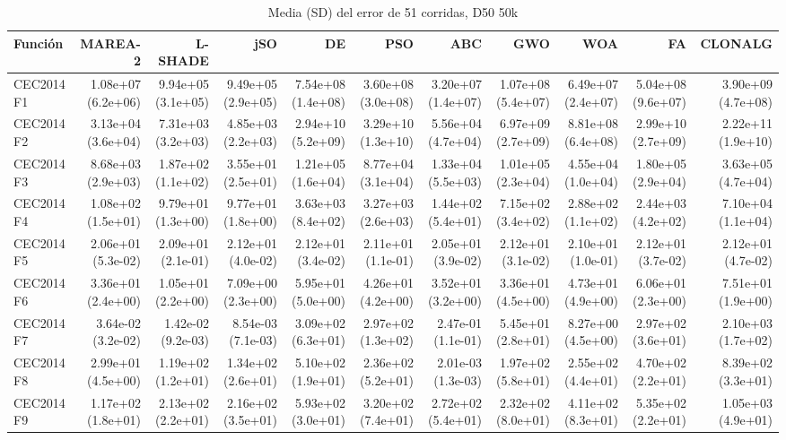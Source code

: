 \begin{longtable}{lrrrrrrrrrr}
\caption{Media (SD) del error de 51 corridas, D50 50k}\\
\toprule
Función & MAREA-2 & L-SHADE & jSO & DE & PSO & ABC & GWO & WOA & FA & CLONALG \\
\midrule
\endhead
CEC2014 F1 & 1.08e+07 (6.2e+06) & 9.94e+05 (3.1e+05) & 9.49e+05 (2.9e+05) & 7.54e+08 (1.4e+08) & 3.60e+08 (3.0e+08) & 3.20e+07 (1.4e+07) & 1.07e+08 (5.4e+07) & 6.49e+07 (2.4e+07) & 5.04e+08 (9.6e+07) & 3.90e+09 (4.7e+08) \\
CEC2014 F2 & 3.13e+04 (3.6e+04) & 7.31e+03 (3.2e+03) & 4.85e+03 (2.2e+03) & 2.94e+10 (5.2e+09) & 3.29e+10 (1.3e+10) & 5.56e+04 (4.7e+04) & 6.97e+09 (2.7e+09) & 8.81e+08 (6.4e+08) & 2.99e+10 (2.7e+09) & 2.22e+11 (1.9e+10) \\
CEC2014 F3 & 8.68e+03 (2.9e+03) & 1.87e+02 (1.1e+02) & 3.55e+01 (2.5e+01) & 1.21e+05 (1.6e+04) & 8.77e+04 (3.1e+04) & 1.33e+04 (5.5e+03) & 1.01e+05 (2.3e+04) & 4.55e+04 (1.0e+04) & 1.80e+05 (2.9e+04) & 3.63e+05 (4.7e+04) \\
CEC2014 F4 & 1.08e+02 (1.5e+01) & 9.79e+01 (1.3e+00) & 9.77e+01 (1.8e+00) & 3.63e+03 (8.4e+02) & 3.27e+03 (2.6e+03) & 1.44e+02 (5.4e+01) & 7.15e+02 (3.4e+02) & 2.88e+02 (1.1e+02) & 2.44e+03 (4.2e+02) & 7.10e+04 (1.1e+04) \\
CEC2014 F5 & 2.06e+01 (5.3e-02) & 2.09e+01 (2.1e-01) & 2.12e+01 (4.0e-02) & 2.12e+01 (3.4e-02) & 2.11e+01 (1.1e-01) & 2.05e+01 (3.9e-02) & 2.12e+01 (3.1e-02) & 2.10e+01 (1.0e-01) & 2.12e+01 (3.7e-02) & 2.12e+01 (4.7e-02) \\
CEC2014 F6 & 3.36e+01 (2.4e+00) & 1.05e+01 (2.2e+00) & 7.09e+00 (2.3e+00) & 5.95e+01 (5.0e+00) & 4.26e+01 (4.2e+00) & 3.52e+01 (3.2e+00) & 3.36e+01 (4.5e+00) & 4.73e+01 (4.9e+00) & 6.06e+01 (2.3e+00) & 7.51e+01 (1.9e+00) \\
CEC2014 F7 & 3.64e-02 (3.2e-02) & 1.42e-02 (9.2e-03) & 8.54e-03 (7.1e-03) & 3.09e+02 (6.3e+01) & 2.97e+02 (1.3e+02) & 2.47e-01 (1.1e-01) & 5.45e+01 (2.8e+01) & 8.27e+00 (4.5e+00) & 2.97e+02 (3.6e+01) & 2.10e+03 (1.7e+02) \\
CEC2014 F8 & 2.99e+01 (4.5e+00) & 1.19e+02 (1.2e+01) & 1.34e+02 (2.6e+01) & 5.10e+02 (1.9e+01) & 2.36e+02 (5.2e+01) & 2.01e-03 (1.3e-03) & 1.97e+02 (5.8e+01) & 2.55e+02 (4.4e+01) & 4.70e+02 (2.2e+01) & 8.39e+02 (3.3e+01) \\
CEC2014 F9 & 1.17e+02 (1.8e+01) & 2.13e+02 (2.2e+01) & 2.16e+02 (3.5e+01) & 5.93e+02 (3.0e+01) & 3.20e+02 (7.4e+01) & 2.72e+02 (5.4e+01) & 2.32e+02 (8.0e+01) & 4.11e+02 (8.3e+01) & 5.35e+02 (2.2e+01) & 1.05e+03 (4.9e+01) \\

\end{longtable}
